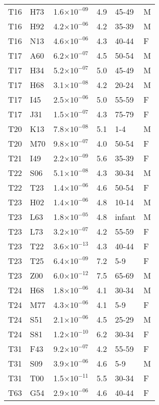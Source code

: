 \begin{longtable}{lllrll}
   T16 & H73 & 1.6$\times10^{-09}$ & 4.9 & 45-49 & M \\ 
   T16 & H92 & 4.2$\times10^{-06}$ & 4.2 & 35-39 & M \\ 
   T16 & N13 & 4.6$\times10^{-06}$ & 4.3 & 40-44 & F \\ 
   T17 & A60 & 6.2$\times10^{-07}$ & 4.5 & 50-54 & M \\ 
   T17 & H34 & 5.2$\times10^{-07}$ & 5.0 & 45-49 & M \\ 
   T17 & H68 & 3.1$\times10^{-08}$ & 4.2 & 20-24 & M \\ 
   T17 & I45 & 2.5$\times10^{-06}$ & 5.0 & 55-59 & F \\ 
   T17 & J31 & 1.5$\times10^{-07}$ & 4.3 & 75-79 & F \\ 
   T20 & K13 & 7.8$\times10^{-08}$ & 5.1 & 1-4 & M \\ 
   T20 & M70 & 9.8$\times10^{-07}$ & 4.0 & 50-54 & F \\ 
   T21 & I49 & 2.2$\times10^{-09}$ & 5.6 & 35-39 & F \\ 
   T22 & S06 & 5.1$\times10^{-08}$ & 4.3 & 30-34 & M \\ 
   T22 & T23 & 1.4$\times10^{-06}$ & 4.6 & 50-54 & F \\ 
   T23 & H02 & 1.4$\times10^{-06}$ & 4.8 & 10-14 & M \\ 
   T23 & L63 & 1.8$\times10^{-05}$ & 4.8 & infant & M \\ 
   T23 & L73 & 3.2$\times10^{-07}$ & 4.2 & 55-59 & F \\ 
   T23 & T22 & 3.6$\times10^{-13}$ & 4.3 & 40-44 & F \\ 
   T23 & T25 & 6.4$\times10^{-09}$ & 7.2 & 5-9 & F \\ 
   T23 & Z00 & 6.0$\times10^{-12}$ & 7.5 & 65-69 & M \\ 
   T24 & H68 & 1.8$\times10^{-06}$ & 4.1 & 30-34 & M \\ 
   T24 & M77 & 4.3$\times10^{-06}$ & 4.1 & 5-9 & F \\ 
   T24 & S51 & 2.1$\times10^{-06}$ & 4.5 & 25-29 & M \\ 
   T24 & S81 & 1.2$\times10^{-10}$ & 6.2 & 30-34 & F \\ 
   T31 & F43 & 9.2$\times10^{-07}$ & 4.2 & 55-59 & F \\ 
   T31 & S09 & 3.9$\times10^{-06}$ & 4.6 & 5-9 & M \\ 
   T31 & T00 & 1.5$\times10^{-11}$ & 5.5 & 30-34 & F \\ 
   T63 & G54 & 2.9$\times10^{-06}$ & 4.6 & 40-44 & F \\ 

\end{longtable}
